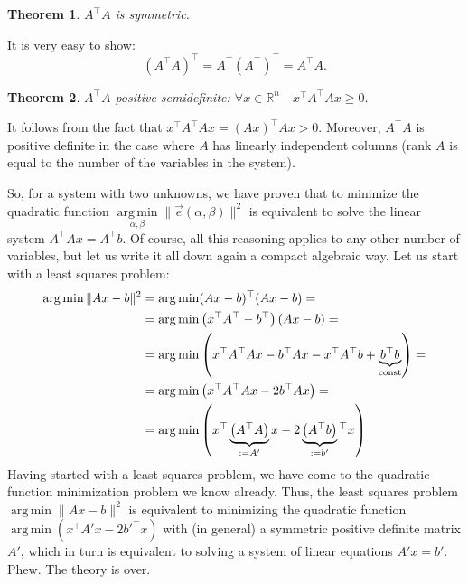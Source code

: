 \documentclass[notitlepage]{report}
\DeclareMathOperator*{\argmin}{arg\,min}
\newtheorem{theorem}{Theorem}
\begin{document}
\begin{theorem}
$A^\top A$ is symmetric.
\end{theorem}
It is very easy to show:
$$
(A^\top A)^\top = A^\top (A^\top)^\top = A^\top A.
$$

\begin{theorem}
	$A^\top A$ positive semidefinite: $\forall x\in \mathbb R^n\quad x^\top A^\top A x \geq 0.$
\end{theorem}
It follows from the fact that $x^\top A^\top A x = (A x)^\top A x > 0$.
Moreover, $A^\top A$ is positive definite in the case where $A$ has linearly independent columns (rank $A$ is equal to the number of the variables in the system).

\vspace{5mm}

So, for a system with two unknowns, we have proven that to minimize the quadratic function $\argmin\limits_{\alpha, \beta} \|\vec{e}(\alpha, \beta)\|^2$
is equivalent to solve the linear system $A^\top A x = A^\top b$.
Of course, all this reasoning applies to any other number of variables, but let us write it all down again a compact algebraic way.
Let us start with a least squares problem:
\begin{align*}
\argmin \| Ax - b \|^2 &= \argmin (Ax-b)^\top (Ax-b) =\\
& = \argmin\left(x^\top A^\top - b^\top\right)(Ax-b) = \\
& = \argmin\left(x^\top A^\top A x - b^\top Ax - x^\top A^\top b + \underbrace{b^\top b}_{\rm const}\right)=\\
& = \argmin\left(x^\top A^\top A x - 2b^\top Ax\right) = \\
& = \argmin\left(x^\top \underbrace{\left(A^\top A\right)}_{:=A'} x - 2\underbrace{\left(A^\top b\right)}_{:=b'}\phantom{}^\top x\right)
\end{align*}
Having started with a least squares problem, we have come to the quadratic function minimization problem we know already.
Thus, the least squares problem $\argmin \| Ax - b \|^2$  is equivalent to minimizing the quadratic function $\argmin \left(x^\top A' x - 2b'^\top x\right)$ 
with (in general) a symmetric positive definite matrix $A'$, which in turn is equivalent to solving a system of linear equations $A'x = b'$. Phew. The theory is over.


\end{document}
